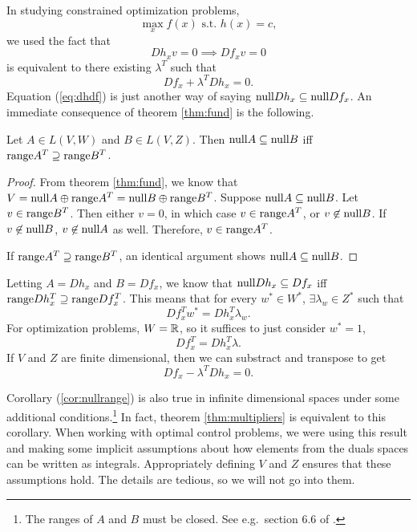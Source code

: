 In studying constrained optimization  problems, 
\[ \max_x f(x) \text{ s.t.  } h(x) = c, \]
we used the fact that
\begin{equation}
  D h_x v = 0 \implies D f_x v = 0 \label{eq:dhdf}
\end{equation}
is equivalent to there existing $\lambda^T$ such that
\[ Df_x + \lambda^T Dh_x = 0. \]
Equation (\ref{eq:dhdf}) is just another way of saying $\mathrm{null} Dh_x
\subseteq \mathrm{null} Df_x$. An immediate consequence of theorem
\ref{thm:fund} is the following. 
\begin{corollary}\label{cor:nullrange}
  Let $A \in L(V,W)$ and $B \in L(V,Z)$. Then $\mathrm{null} A \subseteq
  \mathrm{null} B$ iff $\mathrm{range} A^T \supseteq \mathrm{range} B^T$.
\end{corollary}
\begin{proof}
  From theorem \ref{thm:fund}, we know that $V = \mathrm{null} A \oplus
  \mathrm{range} A^T = \mathrm{null} B \oplus \mathrm{range} B^T$. Suppose $\mathrm{null} A
  \subseteq \mathrm{null} B$. Let $v \in \mathrm{range} B^T$. Then either $v =
  0$, in which case $v \in \mathrm{range} A^T$, or $v \not\in \mathrm{null} B$. If $v
  \not\in \mathrm{null} B$, $v \not\in \mathrm{null} A$ as well. Therefore, $v \in \mathrm{range}
  A^T$. 

  If $\mathrm{range} A^T \supseteq \mathrm{range} B^T$, an identical argument shows
  $\mathrm{null} A \subseteq \mathrm{null} B$.
\end{proof}
Letting $A = Dh_x$ and $B=Df_x$, we know that $\mathrm{null} Dh_x \subseteq
Df_x$ iff $\mathrm{range} Dh_x^T \supseteq \mathrm{range} Df_x^T$. This means that for
every $w^* \in W^*$, $\exists \lambda_w \in Z^*$ such that
\[ Df_x^T w^* = Dh_x^T \lambda_w. \]
For optimization problems, $W=\mathbb{R}$, so it suffices to just consider
$w^* = 1$, 
\[ Df_x^T = Dh_x^T \lambda. \]
 If $V$ and $Z$ are finite dimensional, then we can substract and
 transpose to get
\[ Df_x - \lambda^T Dh_x = 0. \]

Corollary (\ref{cor:nullrange}) is also true in infinite dimensional
spaces under some additional conditions.\footnote{The ranges of $A$
  and $B$ must be closed. See e.g.\ section 6.6 of
  \cite{luenberger1969}.} In fact, theorem \ref{thm:multipliers} is
equivalent to this corollary.  When working with optimal control
problems, we were using this result and making some implicit
assumptions about how elements from the duals spaces can be written as
integrals. Appropriately defining $V$ and $Z$ ensures that these
assumptions hold. The details are tedious, so we will not go into
them.


